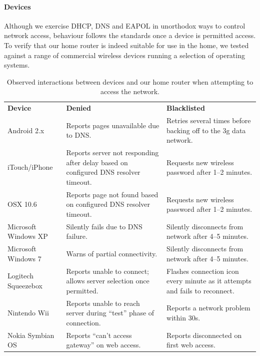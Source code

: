 \paragraph{Devices}
Although we exercise DHCP, DNS and EAPOL in unorthodox ways to control
network access, behaviour follows the standards once a device is
permitted access.  To verify that our home router is indeed suitable
for use in the home, we tested against a range of commercial wireless
devices running a selection of operating systems. 

\begin{table}
\centering\footnotesize
\begin{tabular}{lp{}p{}}
\bf Device 
& \bf Denied 
& \bf Blacklisted\\

Android 2.x 
& Reports pages unavailable due to DNS.  
& Retries several times before backing off to the 3g data network.\\

iTouch/iPhone
& Reports server not responding after delay based on configured DNS
 resolver timeout.  
& Requests new wireless password after 1--2 minutes.\\

OSX 10.6 
& Reports page not found based on configured DNS resolver timeout.  
& Requests new wireless password after 1--2 minutes.\\

Microsoft Windows XP 
& Silently fails due to DNS failure.  
& Silently disconnects from network after 4--5 minutes.\\

Microsoft Windows 7 
& Warns of partial connectivity.  
& Silently disconnects from network after 4--5 minutes.\\

Logitech Squeezebox 
& Reports unable to connect; allows server selection once permitted.
& Flashes connection icon every minute as it attempts and fails to
 reconnect.  \\ 

Nintendo Wii 
& Reports unable to reach server during ``test'' phase of connection.
& Reports a network problem within 30s.\\

Nokia Symbian OS 
& Reports ``can't access gateway'' on web access.  
& Reports disconnected on first web access.\\
\end{tabular}
\caption{\label{t:devices}Observed interactions between devices and
        our home router when attempting to access the network.} 
\vspace{-3.5em}
\end{table}

